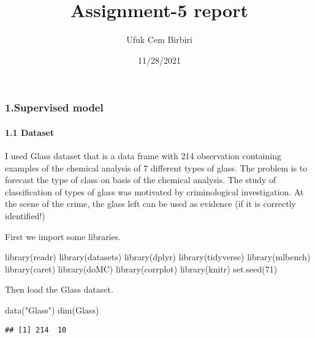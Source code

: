\documentclass[
]{article}
\title{Assignment-5 report}
\author{Ufuk Cem Birbiri}
\date{11/28/2021}
\newenvironment{Shaded}{\begin{snugshade}}{\end{snugshade}}
\newcommand{\DecValTok}[1]{\textcolor[rgb]{0.00,0.00,0.81}{#1}}
\newcommand{\FunctionTok}[1]{\textcolor[rgb]{0.00,0.00,0.00}{#1}}
\newcommand{\NormalTok}[1]{#1}
\newcommand{\StringTok}[1]{\textcolor[rgb]{0.31,0.60,0.02}{#1}}
\begin{document}
\maketitle

\hypertarget{supervised-model}{%
\subsubsection{1.Supervised model}\label{supervised-model}}

\hypertarget{dataset}{%
\paragraph{1.1 Dataset}\label{dataset}}

I used Glass dataset that is a data frame with 214 observation
containing examples of the chemical analysis of 7 different types of
glass. The problem is to forecast the type of class on basis of the
chemical analysis. The study of classification of types of glass was
motivated by criminological investigation. At the scene of the crime,
the glass left can be used as evidence (if it is correctly identified!)

First we import some libraries.

\begin{Shaded}
\begin{Highlighting}[]
\FunctionTok{library}\NormalTok{(readr)}
\FunctionTok{library}\NormalTok{(datasets)}
\FunctionTok{library}\NormalTok{(dplyr)}
\FunctionTok{library}\NormalTok{(tidyverse)}
\FunctionTok{library}\NormalTok{(mlbench)}
\FunctionTok{library}\NormalTok{(caret)}
\FunctionTok{library}\NormalTok{(doMC)}
\FunctionTok{library}\NormalTok{(corrplot)}
\FunctionTok{library}\NormalTok{(knitr)}
\FunctionTok{set.seed}\NormalTok{(}\DecValTok{71}\NormalTok{)}
\end{Highlighting}
\end{Shaded}

Then load the Glass dataset.

\begin{Shaded}
\begin{Highlighting}[]
\FunctionTok{data}\NormalTok{(}\StringTok{"Glass"}\NormalTok{)}
\FunctionTok{dim}\NormalTok{(Glass)}
\end{Highlighting}
\end{Shaded}

\begin{verbatim}
## [1] 214  10
\end{verbatim}
\end{document}
